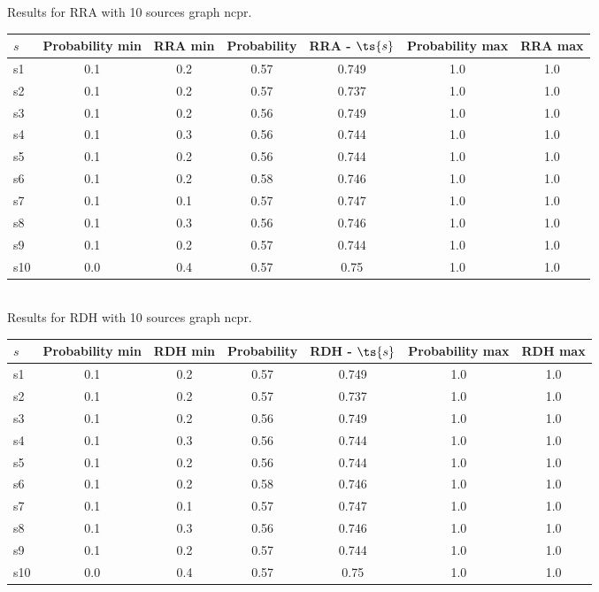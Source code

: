 \documentclass{article}
\begin{document}
\noindent Results for RRA with 10 sources graph ncpr.

\noindent\begin{tabular}{|l|c|c|c|c|c|c|}
\hline
$s$& Probability min & RRA min & Probability & RRA - $\ts{s}$ & Probability max & RRA max\\
\hline
s1 &0.1 & 0.2 & 0.57 & 0.749 & 1.0 & 1.0\\
\hline
s2 &0.1 & 0.2 & 0.57 & 0.737 & 1.0 & 1.0\\
\hline
s3 &0.1 & 0.2 & 0.56 & 0.749 & 1.0 & 1.0\\
\hline
s4 &0.1 & 0.3 & 0.56 & 0.744 & 1.0 & 1.0\\
\hline
s5 &0.1 & 0.2 & 0.56 & 0.744 & 1.0 & 1.0\\
\hline
s6 &0.1 & 0.2 & 0.58 & 0.746 & 1.0 & 1.0\\
\hline
s7 &0.1 & 0.1 & 0.57 & 0.747 & 1.0 & 1.0\\
\hline
s8 &0.1 & 0.3 & 0.56 & 0.746 & 1.0 & 1.0\\
\hline
s9 &0.1 & 0.2 & 0.57 & 0.744 & 1.0 & 1.0\\
\hline
s10 &0.0 & 0.4 & 0.57 & 0.75 & 1.0 & 1.0\\
\hline
\end{tabular}\\

\noindent Results for RDH with 10 sources graph ncpr.

\noindent\begin{tabular}{|l|c|c|c|c|c|c|}
\hline
$s$& Probability min & RDH min & Probability & RDH - $\ts{s}$ & Probability max & RDH max\\
\hline
s1 &0.1 & 0.2 & 0.57 & 0.749 & 1.0 & 1.0\\
\hline
s2 &0.1 & 0.2 & 0.57 & 0.737 & 1.0 & 1.0\\
\hline
s3 &0.1 & 0.2 & 0.56 & 0.749 & 1.0 & 1.0\\
\hline
s4 &0.1 & 0.3 & 0.56 & 0.744 & 1.0 & 1.0\\
\hline
s5 &0.1 & 0.2 & 0.56 & 0.744 & 1.0 & 1.0\\
\hline
s6 &0.1 & 0.2 & 0.58 & 0.746 & 1.0 & 1.0\\
\hline
s7 &0.1 & 0.1 & 0.57 & 0.747 & 1.0 & 1.0\\
\hline
s8 &0.1 & 0.3 & 0.56 & 0.746 & 1.0 & 1.0\\
\hline
s9 &0.1 & 0.2 & 0.57 & 0.744 & 1.0 & 1.0\\
\hline
s10 &0.0 & 0.4 & 0.57 & 0.75 & 1.0 & 1.0\\
\hline
\end{tabular}\\
\end{document}

